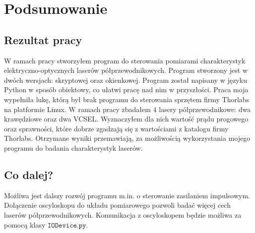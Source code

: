 \chapter{Podsumowanie}
\section{Rezultat pracy}
W ramach pracy stworzyłem program do sterowania pomiarami charakterystyk elektryczno-optycznych laserów półprzewodnikowych.
Program stworzony jest
w dwóch wersjach: skryptowej oraz okienkowej. Program został napisany w języku Python w sposób obiektowy, co ułatwi
pracę nad nim w przyszłości. Praca moja wypełniła lukę, którą był brak programu do sterowania sprzętem firmy Thorlabs
na platformie Linux. W ramach pracy zbadałem 4 lasery półprzewodnikowe: dwa krawędziowe oraz dwa VCSEL. Wyznaczyłem dla nich
wartość prądu progowego oraz sprawności, które dobrze zgadzają się z wartościami z katalogu firmy Thorlabs. Otrzymane wyniki
przemawiają, za możliwością wykorzystania mojego programu do badania charakterystyk laserów.
\section{Co dalej?}
Możliwa jest dalszy rozwój programu m.in. o sterowanie zasilaniem impulsowym. Dołączenie oscyloskopu do układu pomiarowego pozwoli badać więcej cech
laserów półprzewodnikowych. Komunikacja z oscyloskopem będzie możliwa za pomocą klasy $\mathtt{IODevice.py}$.

